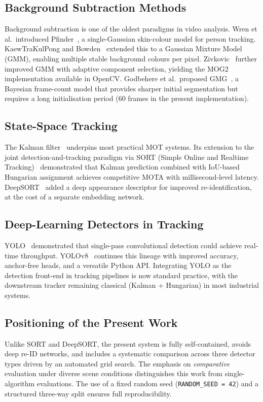 \documentclass[10pt, conference, compsocconf]{IEEEtran}
\begin{document}
\subsection{Background Subtraction Methods}
Background subtraction is one of the oldest paradigms in video
analysis. Wren et al.\ introduced Pfinder~\cite{wren1997}, a
single-Gaussian skin-colour model for person tracking. KaewTraKulPong
and Bowden~\cite{kaewtrakulpong2001} extended this to a Gaussian
Mixture Model (GMM), enabling multiple stable background colours per
pixel. Zivkovic~\cite{zivkovic2004} further improved GMM with
adaptive component selection, yielding the MOG2 implementation
available in OpenCV. Godbehere et al.\ proposed
GMG~\cite{godbehere2012}, a Bayesian frame-count model that provides
sharper initial segmentation but requires a long initialisation period
(60 frames in the present implementation).

\subsection{State-Space Tracking}
The Kalman filter~\cite{kalman1960} underpins most practical MOT
systems. Its extension to the joint detection-and-tracking paradigm
via SORT (Simple Online and Realtime Tracking)~\cite{bewley2016}
demonstrated that Kalman prediction combined with IoU-based Hungarian
assignment achieves competitive MOTA with millisecond-level latency.
DeepSORT~\cite{wojke2017} added a deep appearance descriptor for
improved re-identification, at the cost of a separate embedding network.

\subsection{Deep-Learning Detectors in Tracking}
YOLO~\cite{redmon2016} demonstrated that single-pass convolutional
detection could achieve real-time throughput. YOLOv8~\cite{jocher2023}
continues this lineage with improved accuracy, anchor-free heads, and
a versatile Python API. Integrating YOLO as the detection front-end in
tracking pipelines is now standard practice, with the downstream
tracker remaining classical (Kalman + Hungarian) in most industrial
systems.

\subsection{Positioning of the Present Work}
Unlike SORT and DeepSORT, the present system is fully self-contained,
avoids deep re-ID networks, and includes a systematic comparison
across three detector types driven by an automated grid search. The
emphasis on \emph{comparative} evaluation under diverse scene
conditions distinguishes this work from single-algorithm evaluations.
The use of a fixed random seed (\texttt{RANDOM\_SEED = 42}) and a
structured three-way split ensures full reproducibility.
\end{document}
